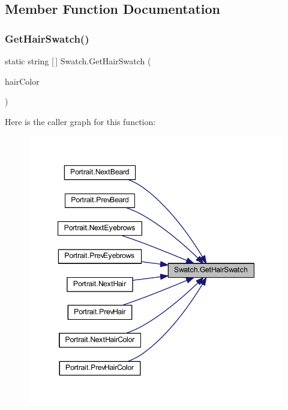\subsection{Member Function Documentation}
\mbox{\label{class_swatch_ad9aee8913b15b1cd21e4d734aeb00f6b}} 
\subsubsection{\texorpdfstring{GetHairSwatch()}{GetHairSwatch()}}
{\footnotesize\ttfamily static string \mbox{[}$\,$\mbox{]} Swatch.\+Get\+Hair\+Swatch (\begin{DoxyParamCaption}\item[{\mbox{\hyperlink{class_character_a7940fffce9bfadb9e7abf15490cf8bb0}{Character.\+Hair\+Color}}}]{hair\+Color }\end{DoxyParamCaption})\hspace{0.3cm}{\ttfamily [static]}}

Here is the caller graph for this function\+:
\nopagebreak
\begin{figure}[H]
\begin{center}
\leavevmode
\includegraphics[width=347pt]{class_swatch_ad9aee8913b15b1cd21e4d734aeb00f6b_icgraph}
\end{center}
\end{figure}
\mbox{\label{class_swatch_aad8681cfc4c7902a684220e08e67b00b}} 
